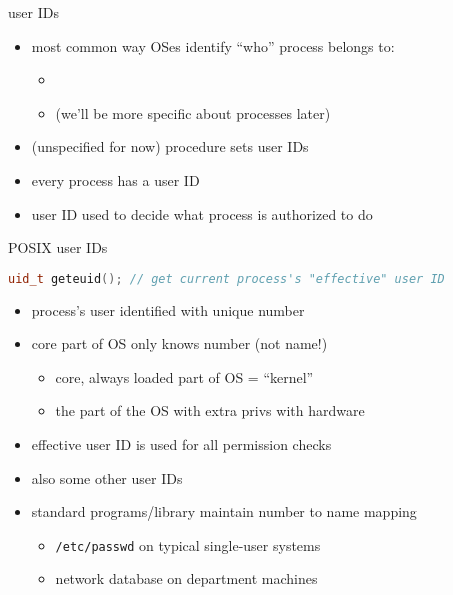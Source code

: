 \begin{frame}{user IDs}
    \begin{itemize}
    \item most common way OSes identify ``who'' process belongs to:
	\begin{itemize}
	\item {}
	\item (we'll be more specific about processes later)
	\end{itemize}
    \vspace{.5cm}
    \item (unspecified for now) procedure sets user IDs
    \item every process has a user ID
    \item user ID used to decide what process is authorized to do
    \end{itemize}
\end{frame}

\begin{frame}[fragile,label=posixUID]{POSIX user IDs}
\begin{lstlisting}[language=C++,style=small]
uid_t geteuid(); // get current process's "effective" user ID
\end{lstlisting}
\begin{itemize}
\item process's user identified with unique number
\item core part of OS only knows number (not name!)
    \begin{itemize}
    \item core, always loaded part of OS = ``kernel''
    \item the part of the OS with extra privs with hardware
    \end{itemize}
\item effective user ID is used for all permission checks
\item also some other user IDs
\vspace{.5cm}
\item<2-> standard programs/library maintain number to name mapping
    \begin{itemize}
    \item<2-> \texttt{/etc/passwd} on typical single-user systems
    \item<2-> network database on department machines
    \end{itemize}
\end{itemize}
\end{frame}
